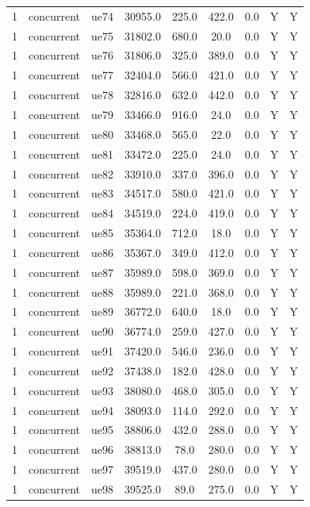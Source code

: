 \begin{table}[ht]
\begin{tabular}{|c|c|c|c|c|c|c|c|c|}
1 & concurrent & ue74 & 30955.0 & 225.0 & 422.0 & 0.0 & Y & Y \\
1 & concurrent & ue75 & 31802.0 & 680.0 & 20.0 & 0.0 & Y & Y \\
1 & concurrent & ue76 & 31806.0 & 325.0 & 389.0 & 0.0 & Y & Y \\
1 & concurrent & ue77 & 32404.0 & 566.0 & 421.0 & 0.0 & Y & Y \\
1 & concurrent & ue78 & 32816.0 & 632.0 & 442.0 & 0.0 & Y & Y \\
1 & concurrent & ue79 & 33466.0 & 916.0 & 24.0 & 0.0 & Y & Y \\
1 & concurrent & ue80 & 33468.0 & 565.0 & 22.0 & 0.0 & Y & Y \\
1 & concurrent & ue81 & 33472.0 & 225.0 & 24.0 & 0.0 & Y & Y \\
1 & concurrent & ue82 & 33910.0 & 337.0 & 396.0 & 0.0 & Y & Y \\
1 & concurrent & ue83 & 34517.0 & 580.0 & 421.0 & 0.0 & Y & Y \\
1 & concurrent & ue84 & 34519.0 & 224.0 & 419.0 & 0.0 & Y & Y \\
1 & concurrent & ue85 & 35364.0 & 712.0 & 18.0 & 0.0 & Y & Y \\
1 & concurrent & ue86 & 35367.0 & 349.0 & 412.0 & 0.0 & Y & Y \\
1 & concurrent & ue87 & 35989.0 & 598.0 & 369.0 & 0.0 & Y & Y \\
1 & concurrent & ue88 & 35989.0 & 221.0 & 368.0 & 0.0 & Y & Y \\
1 & concurrent & ue89 & 36772.0 & 640.0 & 18.0 & 0.0 & Y & Y \\
1 & concurrent & ue90 & 36774.0 & 259.0 & 427.0 & 0.0 & Y & Y \\
1 & concurrent & ue91 & 37420.0 & 546.0 & 236.0 & 0.0 & Y & Y \\
1 & concurrent & ue92 & 37438.0 & 182.0 & 428.0 & 0.0 & Y & Y \\
1 & concurrent & ue93 & 38080.0 & 468.0 & 305.0 & 0.0 & Y & Y \\
1 & concurrent & ue94 & 38093.0 & 114.0 & 292.0 & 0.0 & Y & Y \\
1 & concurrent & ue95 & 38806.0 & 432.0 & 288.0 & 0.0 & Y & Y \\
1 & concurrent & ue96 & 38813.0 & 78.0 & 280.0 & 0.0 & Y & Y \\
1 & concurrent & ue97 & 39519.0 & 437.0 & 280.0 & 0.0 & Y & Y \\
1 & concurrent & ue98 & 39525.0 & 89.0 & 275.0 & 0.0 & Y & Y \\

\end{tabular}
\end{table}
